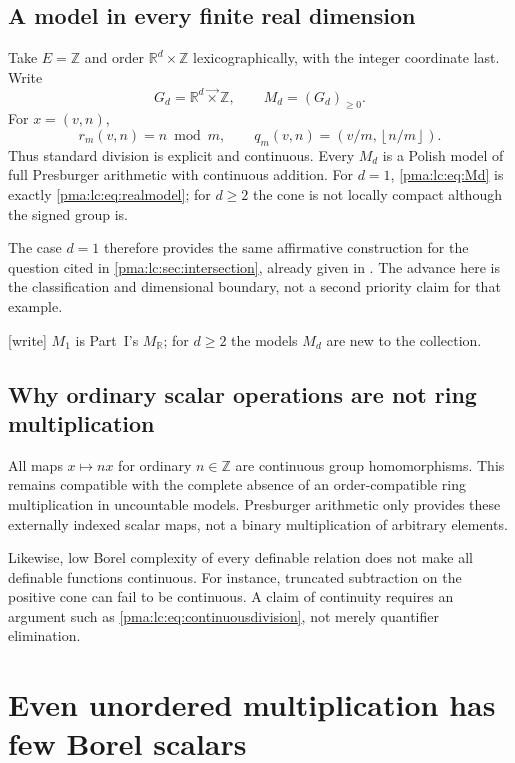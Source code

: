 \documentclass[11pt]{article}
\numberwithin{equation}{section}
\theoremstyle{definition}
\theoremstyle{remark}
\newcommand{\Z}{\mathbb Z}
\newcommand{\R}{\mathbb R}
\newcommand{\lex}{\mathbin{\overrightarrow\times}}
\newcommand{\MR}{M_{\R}}
\newcommand{\writetag}{\textup{\textsf{\small[write]}}}
\begin{document}
\subsection{A model in every finite real dimension}
Take $E=\Z$ and order $\R^d\times\Z$ lexicographically, with the
integer coordinate last. Write
\begin{equation}\label{pma:lc:eq:Md}
 G_d=\R^d\lex\Z,\qquad M_d=(G_d)_{\ge0}.
\end{equation}
For $x=(v,n)$,
\begin{equation}\label{pma:lc:eq:explicitdivision}
 r_m(v,n)=n\bmod m,
 \qquad q_m(v,n)=\left(v/m,\left\lfloor n/m\right\rfloor\right).
\end{equation}
Thus standard division is explicit and continuous. Every $M_d$ is a
Polish model of full Presburger arithmetic with continuous addition.
For $d=1$, \eqref{pma:lc:eq:Md} is exactly \eqref{pma:lc:eq:realmodel}; for $d\ge2$
the cone is not locally compact although the signed group is.

The case $d=1$ therefore provides the same affirmative construction for
the question cited in \cref{pma:lc:sec:intersection}, already given in
\cite{s08:PriorPres}. The advance here is the classification and dimensional
boundary, not a second priority claim for that example.

\noindent\writetag{} $M_1$ is Part~I's $\MR$; for $d\ge2$ the models $M_d$ are
new to the collection.

\subsection{Why ordinary scalar operations are not ring multiplication}
All maps $x\mapsto nx$ for ordinary $n\in\Z$ are continuous group
homomorphisms. This remains compatible with the complete absence of an
order-compatible ring multiplication in uncountable models. Presburger
arithmetic only provides these externally indexed scalar maps, not a
binary multiplication of arbitrary elements.

Likewise, low Borel complexity of every definable relation does not make
all definable functions continuous. For instance, truncated subtraction
on the positive cone can fail to be continuous. A claim of continuity
requires an argument such as \eqref{pma:lc:eq:continuousdivision}, not merely
quantifier elimination.

\section{Even unordered multiplication has few Borel scalars}
\label{pma:lc:sec:scalars}
\end{document}
